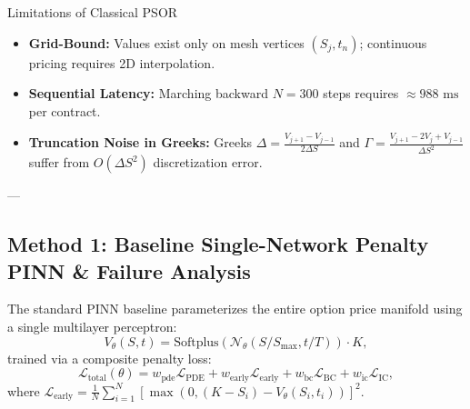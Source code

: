 \documentclass[11pt,a4paper]{article}
\begin{document}
\begin{warningbox}{Limitations of Classical PSOR}
\begin{itemize}[leftmargin=1.2em]
    \item \textbf{Grid-Bound:} Values exist only on mesh vertices $(S_j, t_n)$; continuous pricing requires 2D interpolation.
    \item \textbf{Sequential Latency:} Marching backward $N=300$ steps requires $\approx 988\text{ ms}$ per contract.
    \item \textbf{Truncation Noise in Greeks:} Greeks $\Delta = \frac{V_{j+1}-V_{j-1}}{2\Delta S}$ and $\Gamma = \frac{V_{j+1}-2V_j+V_{j-1}}{\Delta S^2}$ suffer from $O(\Delta S^2)$ discretization error.
\end{itemize}
\end{warningbox}

---

\subsection{Method 1: Baseline Single-Network Penalty PINN \& Failure Analysis}
The standard PINN baseline \cite{raissi2019physics, cuomo2022scientific} parameterizes the entire option price manifold using a single multilayer perceptron:
\begin{equation}
    V_\theta(S, t) = \text{Softplus}\left(\mathcal{N}_\theta(S/S_{\max}, t/T)\right) \cdot K,
\end{equation}
trained via a composite penalty loss:
\begin{equation}
    \mathcal{L}_{\text{total}}(\theta) = w_{\text{pde}} \mathcal{L}_{\text{PDE}} + w_{\text{early}} \mathcal{L}_{\text{early}} + w_{\text{bc}} \mathcal{L}_{\text{BC}} + w_{\text{ic}} \mathcal{L}_{\text{IC}},
\end{equation}
where $\mathcal{L}_{\text{early}} = \frac{1}{N}\sum_{i=1}^N \left[\max(0, (K-S_i) - V_\theta(S_i, t_i))\right]^2$.
\end{document}

